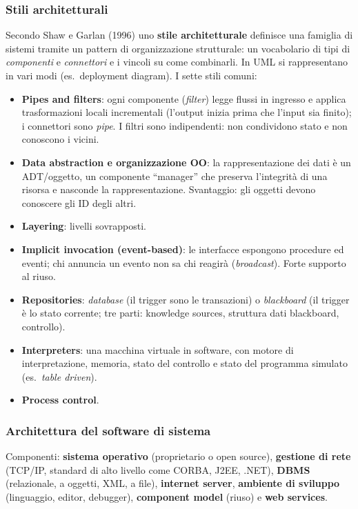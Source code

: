 \documentclass[a4paper,12pt]{article}
\begin{document}
\subsubsection{Stili architetturali}
Secondo Shaw e Garlan (1996) uno \textbf{stile architetturale} definisce una famiglia di
sistemi tramite un pattern di organizzazione strutturale: un vocabolario di tipi di
\emph{componenti} e \emph{connettori} e i vincoli su come combinarli. In UML si
rappresentano in vari modi (es.\ deployment diagram). I sette stili comuni:
\begin{itemize}
  \item \textbf{Pipes and filters}: ogni componente (\emph{filter}) legge flussi in
        ingresso e applica trasformazioni locali incrementali (l'output inizia prima che
        l'input sia finito); i connettori sono \emph{pipe}. I filtri sono indipendenti:
        non condividono stato e non conoscono i vicini.
  \item \textbf{Data abstraction e organizzazione OO}: la rappresentazione dei dati è un
        ADT/oggetto, un componente ``manager'' che preserva l'integrità di una risorsa e
        nasconde la rappresentazione. Svantaggio: gli oggetti devono conoscere gli ID
        degli altri.
  \item \textbf{Layering}: livelli sovrapposti.
  \item \textbf{Implicit invocation (event-based)}: le interfacce espongono procedure ed
        eventi; chi annuncia un evento non sa chi reagirà (\emph{broadcast}). Forte
        supporto al riuso.
  \item \textbf{Repositories}: \emph{database} (il trigger sono le transazioni) o
        \emph{blackboard} (il trigger è lo stato corrente; tre parti: knowledge
        sources, struttura dati blackboard, controllo).
  \item \textbf{Interpreters}: una macchina virtuale in software, con motore di
        interpretazione, memoria, stato del controllo e stato del programma simulato
        (es.\ \emph{table driven}).
  \item \textbf{Process control}.
\end{itemize}

\subsubsection{Architettura del software di sistema}
Componenti: \textbf{sistema operativo} (proprietario o open source), \textbf{gestione
di rete} (TCP/IP, standard di alto livello come CORBA, J2EE, .NET), \textbf{DBMS}
(relazionale, a oggetti, XML, a file), \textbf{internet server}, \textbf{ambiente di
sviluppo} (linguaggio, editor, debugger), \textbf{component model} (riuso) e \textbf{web
services}.
\end{document}
